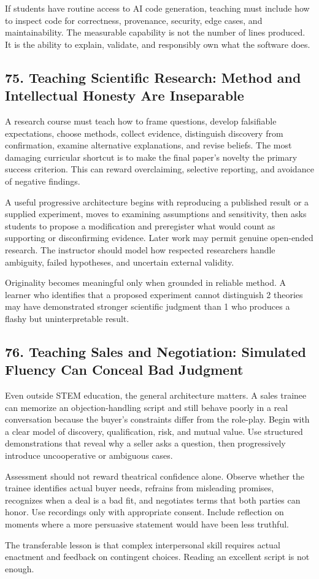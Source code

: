 If students have routine access to AI code generation, teaching must include how to inspect code for correctness, provenance, security, edge cases, and maintainability. The measurable capability is not the number of lines produced. It is the ability to explain, validate, and responsibly own what the software does.

\subsection*{75. Teaching Scientific Research: Method and Intellectual Honesty Are Inseparable}

A research course must teach how to frame questions, develop falsifiable expectations, choose methods, collect evidence, distinguish discovery from confirmation, examine alternative explanations, and revise beliefs. The most damaging curricular shortcut is to make the final paper's novelty the primary success criterion. This can reward overclaiming, selective reporting, and avoidance of negative findings.

A useful progressive architecture begins with reproducing a published result or a supplied experiment, moves to examining assumptions and sensitivity, then asks students to propose a modification and preregister what would count as supporting or disconfirming evidence. Later work may permit genuine open-ended research. The instructor should model how respected researchers handle ambiguity, failed hypotheses, and uncertain external validity.

Originality becomes meaningful only when grounded in reliable method. A learner who identifies that a proposed experiment cannot distinguish 2 theories may have demonstrated stronger scientific judgment than 1 who produces a flashy but uninterpretable result.

\subsection*{76. Teaching Sales and Negotiation: Simulated Fluency Can Conceal Bad Judgment}

Even outside STEM education, the general architecture matters. A sales trainee can memorize an objection-handling script and still behave poorly in a real conversation because the buyer's constraints differ from the role-play. Begin with a clear model of discovery, qualification, risk, and mutual value. Use structured demonstrations that reveal why a seller asks a question, then progressively introduce uncooperative or ambiguous cases.

Assessment should not reward theatrical confidence alone. Observe whether the trainee identifies actual buyer needs, refrains from misleading promises, recognizes when a deal is a bad fit, and negotiates terms that both parties can honor. Use recordings only with appropriate consent. Include reflection on moments where a more persuasive statement would have been less truthful.

The transferable lesson is that complex interpersonal skill requires actual enactment and feedback on contingent choices. Reading an excellent script is not enough.
